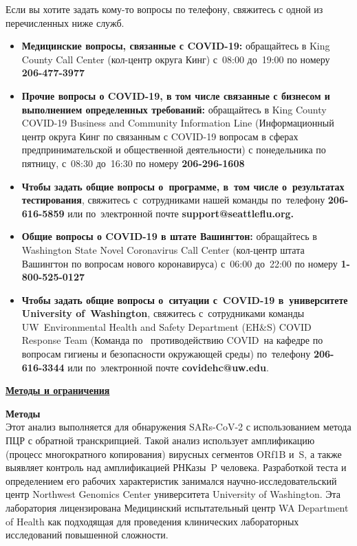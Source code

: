 \documentclass[10pt]{article}
\begin{document}
Если вы хотите задать кому-то вопросы по телефону, свяжитесь с одной из
перечисленных ниже служб.

\begin{itemize}

\item

  \textbf{Медицинские вопросы, связанные с COVID-19:} обращайтесь в King County
  Call Center (кол-центр округа Кинг) с 08:00 до 19:00 по номеру
  \textbf{206-477-3977}

\item

  \textbf{Прочие вопросы о COVID-19, в том числе связанные с бизнесом и
  выполнением определенных требований:} обращайтесь в King County COVID-19
  Business and Community Information Line (Информационный центр округа Кинг по
  связанным с COVID-19 вопросам в сферах предпринимательской и общественной
  деятельности) с понедельника по пятницу, с 08:30 до 16:30 по номеру
  \textbf{206-296-1608}

\item

  \textbf{Чтобы задать общие вопросы о программе, в том числе о результатах
  тестирования}, свяжитесь с сотрудниками нашей команды по телефону
  \textbf{206-616-5859} или по электронной почте
  \textbf{support@seattleflu.org.}

\item

  \textbf{Общие вопросы о COVID-19 в штате Вашингтон:} обращайтесь в Washington
  State Novel Coronavirus Call Center (кол-центр штата Вашингтон по вопросам
  нового коронавируса) с 06:00 до 22:00 по номеру \textbf{1-800-525-0127}

\item
  \textbf{Чтобы задать общие вопросы о ситуации с COVID-19 в университете
  University of Washington}, свяжитесь с сотрудниками команды UW Environmental
  Health and Safety Department (EH\&S) COVID Response Team (Команда по 
  противодействию COVID на кафедре по вопросам гигиены и безопасности окружающей
  среды) по телефону \textbf{206-616-3344} или по электронной почте
  \textbf{covidehc@uw.edu}.

\end{itemize}

\bigskip

\large \underline{\textbf{Методы и ограничения}}

\textbf{Методы}\\
Этот анализ выполняется для обнаружения SARs-CoV-2 с использованием метода ПЦР с
обратной транскрипцией. Такой анализ использует амплификацию (процесс
многократного копирования) вирусных сегментов ORf1B и S, а также выявляет
контроль над амплификацией РНКазы P человека. Разработкой теста и определением
его рабочих характеристик занимался научно-исследовательский центр Northwest
Genomics Center университета University of Washington. Эта лаборатория
лицензирована Медицинский испытательный центр WA Department of Health как
подходящая для проведения клинических лабораторных исследований повышенной
сложности.
\end{document}
